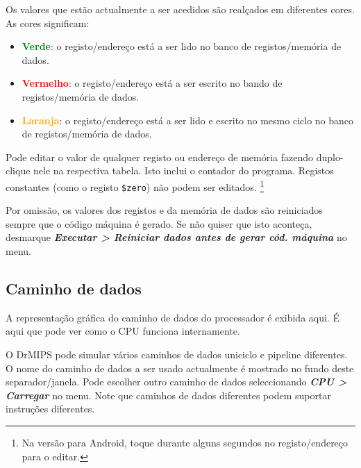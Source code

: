 \documentclass[11pt,a4paper,twoside,titlepage]{article}
\newcommand{\menupath}[1]{\textbf{\emph{#1}}}
\begin{document}
Os valores que estão actualmente a ser acedidos são realçados em diferentes 
cores. As cores significam:
\begin{itemize}
	\item \textbf{\textcolor{green}{Verde}}: o registo/endereço está a ser lido
		no banco de registos/memória de dados.
	\item \textbf{\textcolor{red}{Vermelho}}: o registo/endereço está a ser
		escrito no bando de registos/memória de dados.
	\item \textbf{\textcolor{orange}{Laranja}}: o registo/endereço está a ser
		lido e escrito no mesmo ciclo no banco de registos/memória de dados.
\end{itemize}

Pode editar o valor de qualquer registo ou endereço de memória fazendo 
duplo-clique nele na respectiva tabela. Isto inclui o contador do programa.
Registos constantes (como o registo \verb+$zero+) não podem ser editados.
\footnote{Na versão para Android, toque durante alguns segundos no
registo/endereço para o editar.}

Por omissão, os valores dos registos e da memória de dados são reiniciados
sempre que o código máquina é gerado.
Se não quiser que isto aconteça, desmarque 
\menupath{Executar > Reiniciar dados antes de gerar cód. máquina} no menu.


\subsection{Caminho de dados}

A representação gráfica do caminho de dados do processador é exibida aqui.
É aqui que pode ver como o CPU funciona internamente.

O DrMIPS pode simular vários caminhos de dados uniciclo e pipeline diferentes.
O nome do caminho de dados a ser usado actualmente é mostrado no fundo deste
separador/janela. Pode escolher outro caminho de dados seleccionando
\menupath{CPU > Carregar} no menu.
Note que caminhos de dados diferentes podem suportar instruções diferentes.
\end{document}
